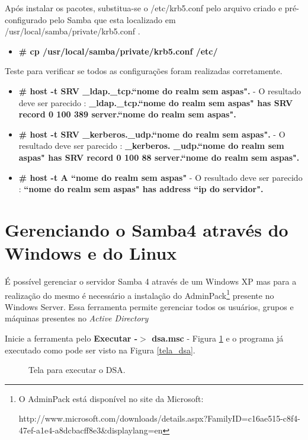 Após instalar os pacotes, substitua-se o /etc/krb5.conf pelo arquivo criado e pré-configurado pelo Samba que esta localizado em /usr/local/samba/private/krb5.conf .

\begin{itemize}
	\item \textbf{\# cp /usr/local/samba/private/krb5.conf  /etc/}
\end{itemize}

Teste para verificar se todos as configurações foram realizadas corretamente.

\begin{itemize}
	\item \textbf{\# host -t SRV \_ldap.\_tcp.``nome do realm sem aspas".} - O resultado deve ser parecido : \textbf{\_ldap.\_tcp.``nome do realm sem aspas" has SRV record 0 100 389 server.``nome do realm sem aspas".}
	\item \textbf{\# host -t SRV \_kerberos.\_udp.``nome do realm sem aspas".} - O resultado deve ser parecido : \textbf{\_kerberos. \_udp.``nome do realm sem aspas" has SRV record 0 100 88 server.``nome do realm sem aspas".}
	\item \textbf{\# host -t A ``nome do realm sem aspas"} - O resultado deve ser parecido : \textbf{``nome do realm sem aspas" has address ``ip do servidor".} 
\end{itemize}

\section{Gerenciando o Samba4 através do Windows e do Linux}

É possível gerenciar o servidor Samba 4 através de um Windows XP mas para a realização do mesmo é necessário a instalação do AdminPack\footnote[4]{O AdminPack está disponível no site da Microsoft:

http://www.microsoft.com/downloads/details.aspx?FamilyID=c16ae515-c8f4-47ef-a1e4-a8dcbacff8e3\&displaylang=en} presente no Windows Server. Essa ferramenta permite gerenciar todos os usuários, grupos e máquinas presentes no \textit{Active Directory}

Inicie a ferramenta pelo \textbf{Executar -$>$ dsa.msc} - Figura \ref{dsa} e o programa já executado como pode ser visto na Figura \ref{tela_dsa}.

\begin{figure}[ht]
   	\centering
   	\caption{Tela para executar o DSA.}
    \label{dsa}
\end{figure}
 
